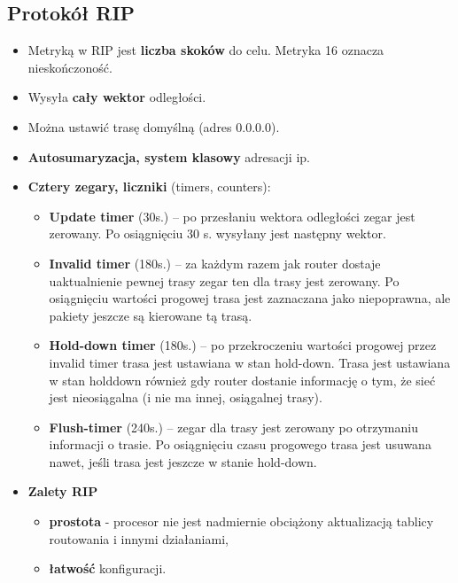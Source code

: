 \documentclass[../main.tex]{subfiles}
\begin{document}
    \subsection{Protokół RIP}
    \begin{itemize}
        \item Metryką w RIP jest \textbf{liczba skoków} do celu. Metryka 16 oznacza nieskończoność.
        \item Wysyła \textbf{cały wektor} odległości.

        \item Można ustawić trasę domyślną (adres 0.0.0.0).

        \item \textbf{Autosumaryzacja, system klasowy} adresacji ip.

        \item \textbf{Cztery zegary, liczniki} (timers, counters):
        \begin{itemize}
            \item \textbf{Update timer} (30s.) – po przesłaniu wektora odległości
            zegar jest zerowany. Po osiągnięciu 30 s. wysyłany jest następny wektor.
            \item \textbf{Invalid timer} (180s.) – za każdym razem jak router dostaje uaktualnienie pewnej trasy zegar ten dla trasy jest zerowany. Po osiągnięciu wartości progowej trasa jest zaznaczana jako niepoprawna, ale pakiety jeszcze są kierowane tą trasą.
            \item \textbf{Hold-down timer} (180s.) – po przekroczeniu wartości progowej
            przez invalid timer trasa jest ustawiana w stan hold-down. Trasa jest ustawiana w stan holddown również gdy router dostanie informację o tym, że sieć jest nieosiągalna (i nie ma innej, osiągalnej trasy).
            \item \textbf{Flush-timer} (240s.) – zegar dla trasy jest zerowany po otrzymaniu informacji o trasie. Po osiągnięciu czasu progowego trasa jest usuwana nawet, jeśli trasa jest jeszcze w stanie hold-down.
        \end{itemize}

        \item \textbf{Zalety RIP}
        \begin{itemize}
            \item \textbf{prostota} - procesor nie jest nadmiernie obciążony aktualizacją tablicy routowania i innymi działaniami,
            \item \textbf{łatwość} konfiguracji.
        \end{itemize}


\end{itemize}
\end{document}
